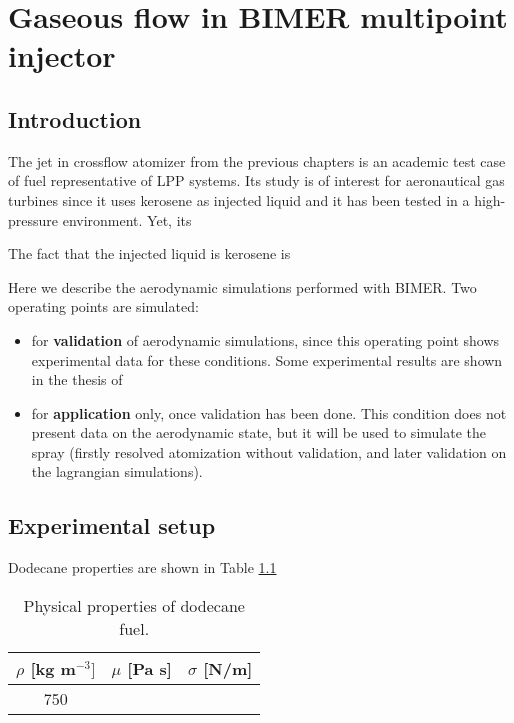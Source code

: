 \chapter{Gaseous flow in BIMER multipoint injector}
	\label{ch:bimer_test_bench}

\section{Introduction}

The jet in crossflow atomizer from the previous chapters is an academic test case of fuel representative of LPP systems. Its study is of interest for aeronautical gas turbines since it uses kerosene as injected liquid and it has been tested in a high-pressure environment. Yet, its

The fact that the injected liquid is kerosene is 

Here we describe the aerodynamic simulations performed with BIMER. Two operating points are simulated:

\begin{itemize}

	\item {} for \textbf{validation} of aerodynamic simulations, since this operating point shows experimental data for these conditions. Some experimental results are shown in the thesis of 
	
	\item {} for \textbf{application} only, once validation has been done. This condition does not present data on the aerodynamic state, but it will be used to simulate the spray (firstly resolved atomization without validation, and later validation on the lagrangian simulations).

\end{itemize}

\section{Experimental setup}

Dodecane properties are shown in Table \ref{tab:dodecane_properties}

\begin{table}[!h]
\centering
\caption{Physical properties of dodecane fuel.}
\begin{tabular}{|c|c|c|}
\hline
$\rho$ [kg m$^{-3}]$   & $\mu$ [Pa s]   & $\sigma$ [N/m]  \\
\hline
750 & & \\
\hline
\end{tabular}
\label{tab:dodecane_properties}
\end{table}


